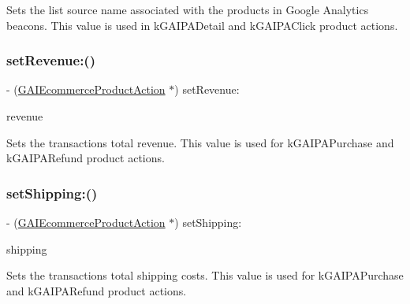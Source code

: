 Sets the list source name associated with the products in Google Analytics beacons. This value is used in k\+G\+A\+I\+P\+A\+Detail and k\+G\+A\+I\+P\+A\+Click product actions. \mbox{\label{interface_g_a_i_ecommerce_product_action_abcb5406f9f38402a23b26174a7af6206}} 
\subsubsection{\texorpdfstring{set\+Revenue\+:()}{setRevenue:()}}
{\footnotesize\ttfamily -\/ (\hyperlink{interface_g_a_i_ecommerce_product_action}{G\+A\+I\+Ecommerce\+Product\+Action} $\ast$) set\+Revenue\+: \begin{DoxyParamCaption}\item[{(N\+S\+Number $\ast$)}]{revenue }\end{DoxyParamCaption}}

Sets the transaction\textquotesingle{}s total revenue. This value is used for k\+G\+A\+I\+P\+A\+Purchase and k\+G\+A\+I\+P\+A\+Refund product actions. \mbox{\label{interface_g_a_i_ecommerce_product_action_a6419c96e6e0e871bb0ab0115e9358ac2}} 
\subsubsection{\texorpdfstring{set\+Shipping\+:()}{setShipping:()}}
{\footnotesize\ttfamily -\/ (\hyperlink{interface_g_a_i_ecommerce_product_action}{G\+A\+I\+Ecommerce\+Product\+Action} $\ast$) set\+Shipping\+: \begin{DoxyParamCaption}\item[{(N\+S\+Number $\ast$)}]{shipping }\end{DoxyParamCaption}}

Sets the transaction\textquotesingle{}s total shipping costs. This value is used for k\+G\+A\+I\+P\+A\+Purchase and k\+G\+A\+I\+P\+A\+Refund product actions. \mbox{\label{interface_g_a_i_ecommerce_product_action_ab17db217703315dc44cca39c272c7c00}} 
